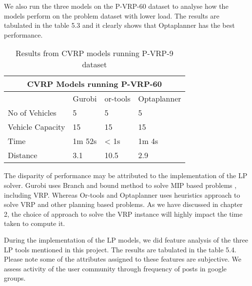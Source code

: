 We also run the three models on the P-VRP-60 dataset to analyse how the models perform on the problem dataset with lower
load.  The results are tabulated in the table 5.3 and it clearly shows that Optaplanner has the best performance.
\vspace{0.5cm}
\begin{table}[!ht]
\centering
\begin{tabular}{|l|l|l|l|}
\hline
\multicolumn{4}{|c|}{CVRP Models running P-VRP-60} \\ \hline
              & Gurobi         & or-tools       & Optaplanner    \\ \hline
No of Vehicles & 5               & 5              & 5            \\ \hline
Vehicle Capacity & 15               & 15              & 15             \\ \hline
Time          & 1m 52s  & < 1s  & 1m 4s \\ \hline
Distance      & 3.1           & 10.5          & 2.9           \\ \hline
\end{tabular}
\caption{Results from CVRP models running P-VRP-9 dataset}
\label{p60-table}
\end{table}

The disparity of performance may be attributed to the implementation of the LP solver.
Gurobi uses Branch and bound method to solve MIP based problems \cite{gurobi:mip}, including VRP. Whereas
 Or-tools and Optaplanner uses heuristics approach to solve VRP and other planning based problems. As we have
  discussed in chapter 2, the choice of approach to solve the VRP instance will highly impact the time taken to compute it.

During the implementation of the LP models, we did feature analysis of the three LP tools mentioned in this project.
The results are tabulated in the table 5.4. Please note some of the attributes assigned to these features are subjective.
We assess activity of the user community through frequency of posts in google groups.

